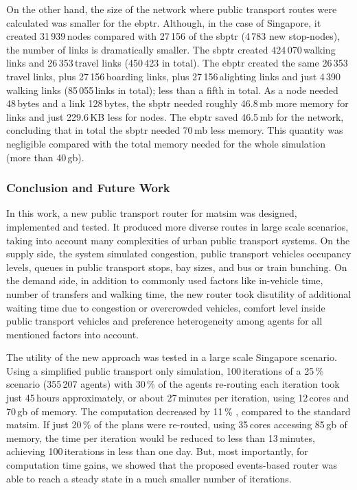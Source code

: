 On the other hand, the size of the network where public transport routes were calculated was smaller for the \gls{ebptr}. Although, in the case of Singapore, it created 31\,939\,nodes compared with 27\,156 of the \gls{sbptr} (4\,783 new stop-nodes), the number of links is dramatically smaller. The \gls{sbptr} created 424\,070\,walking links and 26\,353\,travel links (450\,423 in total). The \gls{ebptr} created the same 26\,353\,travel links, plus 27\,156\,boarding links, plus 27\,156\,alighting links and just 4\,390\,walking links (85\,055\,links in total); less than a fifth in total. As a node needed 48\,bytes and a link 128\,bytes, the \gls{sbptr} needed roughly 46.8\,\gls{mb} more memory for links and just 229.6\,KB less for nodes. The \gls{ebptr} saved 46.5\,\gls{mb} for the network, concluding that in total the \gls{sbptr} needed 70\,\gls{mb} less memory. This quantity was negligible compared with the total memory needed for the whole simulation (more than 40\,\gls{gb}).

\subsubsection{Conclusion and Future Work} 
\label{sec:ConclusionsAndOutlook}
In this work, a new public transport router for \gls{matsim} was designed, implemented and tested. It produced more diverse routes in large scale scenarios, taking into account many complexities of urban public transport systems. On the supply side, the system simulated congestion, public transport vehicles occupancy levels, queues in public transport stops, bay sizes, and bus or train bunching. On the demand side, in addition to commonly used factors like in-vehicle time, number of transfers and walking time, the new router took disutility of additional waiting time due to congestion or overcrowded vehicles, comfort level inside public transport vehicles and preference heterogeneity among agents for all mentioned factors into account.

The utility of the new approach was tested in a large scale Singapore scenario. Using a simplified public transport only simulation, 100\,iterations of a 25\,\% scenario (355\,207 agents) with 30\,\% of the agents re-routing each iteration took just 45\,hours approximately, or about 27\,minutes per iteration, using 12\,cores and 70\,\gls{gb} of memory. The computation decreased by 11\,\% , compared to the standard \gls{matsim}. If just 20\,\% of the plans were re-routed, using 35\,cores accessing 85\,\gls{gb} of memory, the time per iteration would be reduced to less than 13\,minutes, achieving 100\,iterations in less than one day. But, most importantly, for computation time gains, we showed that the proposed events-based router was able to reach a steady state in a much smaller number of iterations.

